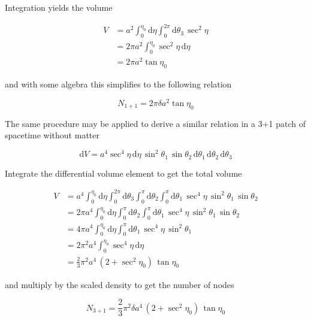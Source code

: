 \documentclass[preprint,notitlepage,amsmath,amssymb,floatfix]{revtex4-1}
\begin{document}
\noindent Integration yields the volume

\begin{equation}
\begin{split}
V &= a^2\int_0^{\eta_0}\!\mathrm{d}\eta\int_0^{2\pi}\!\mathrm{d}\theta_3\,\sec^2\eta \\
  &= 2\pi a^2\int_0^{\eta_0}\!\sec^2\eta\,\mathrm{d}\eta \\
  &= 2\pi a^2\tan\eta_0
\end{split}
\end{equation}

\noindent and with some algebra this simplifies to the following relation

\begin{equation}
\label{eq:finalN1}
N_{\mathrm{1+1}} = 2\pi\delta a^2\tan\eta_0
\end{equation}

\noindent The same procedure may be applied to derive a similar relation in a 3+1 patch of spacetime without matter

\begin{equation}
\mathrm{d}V = a^4\sec^4\eta\,\mathrm{d}\eta\,\sin^2\theta_1\,\sin\theta_2\,\mathrm{d}\theta_1\,\mathrm{d}\theta_2\,\mathrm{d}\theta_3
\end{equation}

\noindent Integrate the differential volume element to get the total volume

\begin{equation}
\begin{split}
V &= a^4\int_0^{\eta_0}\!\mathrm{d}\eta\int_0^{2\pi}\!\mathrm{d}\theta_3\int_0^\pi\!\mathrm{d}\theta_2\int_0^\pi\!\mathrm{d}\theta_1\,\sec^4\eta\,\sin^2\theta_1\,\sin\theta_2 \\
  &= 2\pi a^4\int_0^{\eta_0}\!\mathrm{d}\eta\int_0^\pi\!\mathrm{d}\theta_2\int_0^\pi\!\mathrm{d}\theta_1\,\sec^4\eta\,\sin^2\theta_1\,\sin\theta_2 \\
  &= 4\pi a^4\int_0^{\eta_0}\!\mathrm{d}\eta\int_0^\pi\!\mathrm{d}\theta_1\,\sec^4\eta\,\sin^2\theta_1 \\
  &= 2\pi^2 a^4\int_0^{\eta_0}\!\sec^4\eta\,\mathrm{d}\eta \\
  &= \frac{2}{3}\pi^2 a^4\,\left(2+\sec^2\eta_0\right)\,\tan\eta_0
\end{split}
\end{equation}

\noindent and multiply by the scaled density to get the number of nodes

\begin{equation}
\label{eq:finalN3}
N_{\mathrm{3+1}} = \frac{2}{3}\pi^2\delta a^4\,\left(2+\sec^2\eta_0\right)\,\tan\eta_0
\end{equation}
\end{document}
